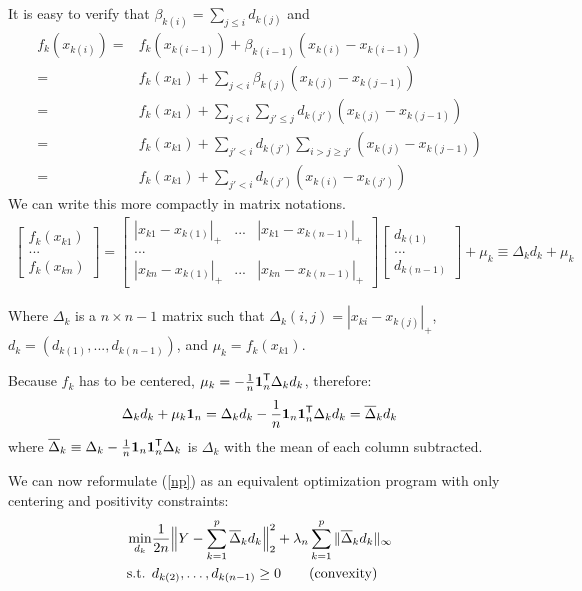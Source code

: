 It is easy to verify that $\beta_{k(i)} = \sum_{j \leq i} d_{k(j)}$ and 
\begin{align*}
f_k(x_{k(i)}) = & f_k(x_{k(i-1)}) + \beta_{k(i-1)}(x_{k(i)} - x_{k(i-1)}) \\
 =& f_k(x_{k1}) + \sum_{j < i} \beta_{k(j)} (x_{k(j)} - x_{k(j-1)}) \\
 =& f_k(x_{k1}) + \sum_{j < i} \sum_{j' \leq j} d_{k(j')} (x_{k(j)} - x_{k(j-1)})\\
 =& f_k(x_{k1}) + \sum_{j' < i} d_{k(j')} \sum_{i > j \geq j'} (x_{k(j)} - x_{k(j-1)}) \\
 =& f_k(x_{k1}) + \sum_{j' < i} d_{k(j')} (x_{k(i)} - x_{k(j')})
\end{align*}
We can write this more compactly in matrix notations.
\begin{equation*}
\begin{split}
\left[ \begin{array}{c}
f_k(x_{k1}) \\
... \\
f_k(x_{kn}) 
\end{array} \right] =
\left[ \begin{array}{ccc}
    |x_{k1} - x_{k(1)}|_+ & ... & |x_{k1} - x_{k(n-1)}|_+ \\
    ... & & \\
    |x_{kn} - x_{k(1)}|_+ & ... & |x_{kn} - x_{k(n-1)}|_+ 
\end{array} \right]
\left[ \begin{array}{c}
    d_{k(1)} \\
    ... \\
    d_{k(n-1)}
\end{array} \right] 
+ \mu_k \equiv \Delta_k d_k + \mu_k
\end{split}
\end{equation*}


Where $\Delta_k$ is a $n\times n-1$ matrix such that $\Delta_k(i,j) = |x_{ki} - x_{k(j)}|_+$, $d_k = (d_{k(1)} ,..., d_{k(n-1)})$, and $\mu_k = f_k(x_{k1})$. 

Because $f_k$ has to be centered, $\mu_k = - \frac{1}{n} \mbox{\boldmath $1$}_n^{\mathsf{T}} \Delta_k d_k$, therefore:
\[
\Delta_k d_k + \mu_k \mbox{\boldmath $1$}_n = 
   \Delta_k d_k - \frac{1}{n} \mbox{\boldmath $1$}_n \mbox{\boldmath $1$}_n^{\mathsf{T}} \Delta_k d_k = 
   \overline{\Delta}_k d_k 
\]
where $\overline{\Delta}_k \equiv \Delta_k - \frac{1}{n} \mbox{\boldmath $1$}_n \mbox{\boldmath $1$}_n^{\mathsf{T}} \Delta_k$ is $\Delta_k$ with the mean of each column subtracted.

We can now reformulate (\ref{np}) as an equivalent optimization program with only centering and positivity constraints:
\begin{align}
\min_{d_k}& \frac{1}{2n} 
       \Bigl\| Y - \sum_{k=1}^p 
              \overline{\Delta}_k d_k \Bigr\|_2^2 
               + \lambda_n \sum_{k=1}^p \|\overline{\Delta}_k d_k \|_\infty   
     \label{opt:alternate_opt} \\
\textrm{s.t. }  & d_{k(2)}, \ldots , d_{k(n-1)} \geq 0  	
               \qquad \textrm{(convexity)} \nonumber 
\end{align}

